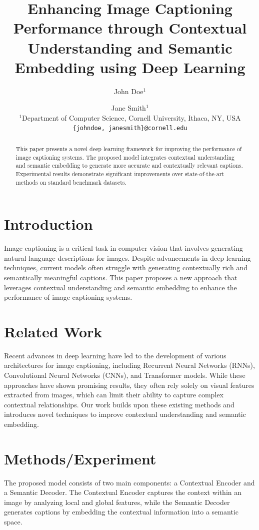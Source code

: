 \documentclass[12pt]{article}
\title{Enhancing Image Captioning Performance through Contextual Understanding and Semantic Embedding using Deep Learning}
\author{
  John Doe$^{1}$ \and Jane Smith$^{1}$ \\
  \small $^{1}$Department of Computer Science, Cornell University, Ithaca, NY, USA \\
  \small \texttt{\{johndoe, janesmith\}@cornell.edu}
}
\date{}
\begin{document}
\maketitle

\begin{abstract}
This paper presents a novel deep learning framework for improving the performance of image captioning systems. The proposed model integrates contextual understanding and semantic embedding to generate more accurate and contextually relevant captions. Experimental results demonstrate significant improvements over state-of-the-art methods on standard benchmark datasets.
\end{abstract}

\section{Introduction}
Image captioning is a critical task in computer vision that involves generating natural language descriptions for images. Despite advancements in deep learning techniques, current models often struggle with generating contextually rich and semantically meaningful captions. This paper proposes a new approach that leverages contextual understanding and semantic embedding to enhance the performance of image captioning systems.

\section{Related Work}
Recent advances in deep learning have led to the development of various architectures for image captioning, including Recurrent Neural Networks (RNNs), Convolutional Neural Networks (CNNs), and Transformer models. While these approaches have shown promising results, they often rely solely on visual features extracted from images, which can limit their ability to capture complex contextual relationships. Our work builds upon these existing methods and introduces novel techniques to improve contextual understanding and semantic embedding.

\section{Methods/Experiment}
The proposed model consists of two main components: a Contextual Encoder and a Semantic Decoder. The Contextual Encoder captures the context within an image by analyzing local and global features, while the Semantic Decoder generates captions by embedding the contextual information into a semantic space.
\end{document}

